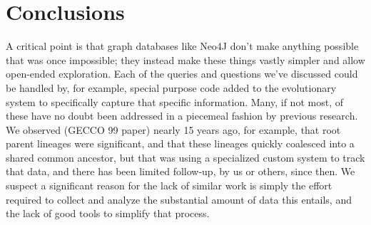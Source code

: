 \documentclass[12pt]{article}
\begin{document}
\section{Conclusions} \label{sec:conclusion}


A critical point is that graph databases like Neo4J don't make anything possible that was once impossible; 
they instead make these things vastly simpler and allow open-ended exploration. Each of the queries and questions
we've discussed could be handled by, for example, special purpose code added to the evolutionary system to specifically
capture that specific information. Many, if not most, of these have no doubt been addressed in a piecemeal fashion
by previous research. We observed (GECCO 99 paper) nearly 15 years ago, for example, that root parent lineages were
significant, and that these lineages quickly coalesced into a shared common ancestor, but that was using a specialized
custom system to track that data, and there has been limited follow-up, by us or others, since then. We suspect a
significant reason for the lack of similar work is simply the effort required to collect and analyze the substantial
amount of data this entails, and the lack of good tools to simplify that process.




\end{document}
